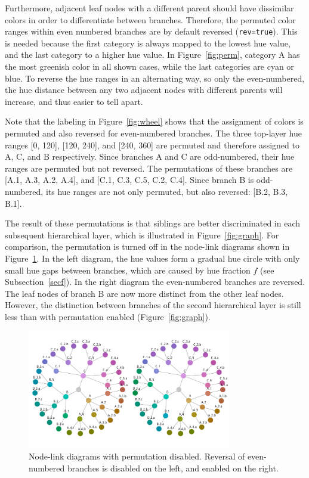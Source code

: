 \documentclass[review,journal]{vgtc}         %
\begin{document}
Furthermore, adjacent leaf nodes with a different parent should have dissimilar colors in order to differentiate between branches. Therefore, the permuted color ranges within even numbered branches are by default reversed (\texttt{rev=true}). This is needed because the first category is always mapped to the lowest hue value, and the last category to a higher hue value. In Figure~\ref{fig:perm}, category A has the most greenish color in all shown cases, while the last categories are cyan or blue. To reverse the hue ranges in an alternating way, so only the even-numbered, the hue distance between any two adjacent nodes with different parents will increase, and thus easier to tell apart. 

Note that the labeling in Figure~\ref{fig:wheel} shows that the assignment of colors is permuted and also reversed for even-numbered branches. The three top-layer hue ranges [0, 120], [120, 240], and [240, 360] are permuted and therefore assigned to A, C, and B respectively. Since branches A and C are odd-numbered, their hue ranges are permuted but not reversed. The permutations of these branches are [A.1, A.3, A.2, A.4], and [C.1, C.3, C.5, C.2, C.4]. Since branch B is odd-numbered, its hue ranges are not only permuted, but also reversed: [B.2, B.3, B.1].

The result of these permutations is that siblings are better discriminated in each subsequent 
hierarchical layer, which is illustrated in Figure~\ref{fig:graph}. For comparison, the permutation 
is turned off in the node-link diagrams shown in Figure~\ref{fig:graph_noperm}. In the left diagram, the hue values 
form a gradual hue circle with only small hue gaps between branches, which are caused by hue fraction $f$ (see Subsection~\ref{secf}). In the right diagram the even-numbered branches are reversed. The leaf nodes of branch B are now more distinct from the other leaf nodes. However, the distinction between branches of the second hierarchical layer is still less than with permutation enabled (Figure~\ref{fig:graph}).

\begin{figure}[!b]

  \centering
  \includegraphics[width=3.5in]{HCPgraph2.pdf}
  \caption{Node-link diagrams with permutation disabled. Reversal of even-numbered branches is disabled on the left, and enabled on the right.}\label{fig:graph_noperm}

\end{figure}
\end{document}
